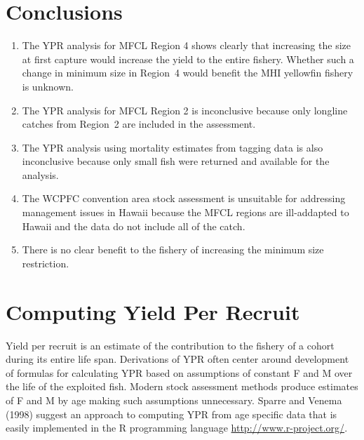 \documentclass[12pt,letterpaper,twoside]{article}
\begin{document}
\section*{Conclusions}
\begin{enumerate}
\item The YPR analysis for MFCL Region 4 shows clearly that increasing
the size at first capture would increase the yield to the entire fishery.
Whether such a change in minimum size in Region~4 would
benefit the MHI yellowfin fishery is unknown.

\item The YPR analysis for MFCL Region 2 is inconclusive because only
longline catches from Region~2 are included in the assessment.

\item The YPR analysis using mortality estimates from tagging data is
also inconclusive because only small fish were returned and
available for the analysis. 

\item The WCPFC convention area stock assessment is unsuitable for
addressing management issues in Hawaii because the
MFCL regions are ill-addapted to Hawaii and the data do not include
all of the catch.

\item There is no clear benefit to the fishery of increasing the
minimum size restriction.
\end{enumerate}


\section*{Computing Yield Per Recruit}


Yield per recruit is an estimate of the contribution to the fishery of
a cohort during its entire life span.
Derivations of YPR often center around development of formulas for
calculating YPR based on assumptions of constant F and M over the life
of the exploited fish. Modern stock assessment methods produce
estimates of F and M by age making such assumptions unnecessary.
Sparre and Venema (1998) suggest an approach to computing YPR from age
specific data that is easily implemented in the R programming language
\url{http://www.r-project.org/}.
\end{document}
